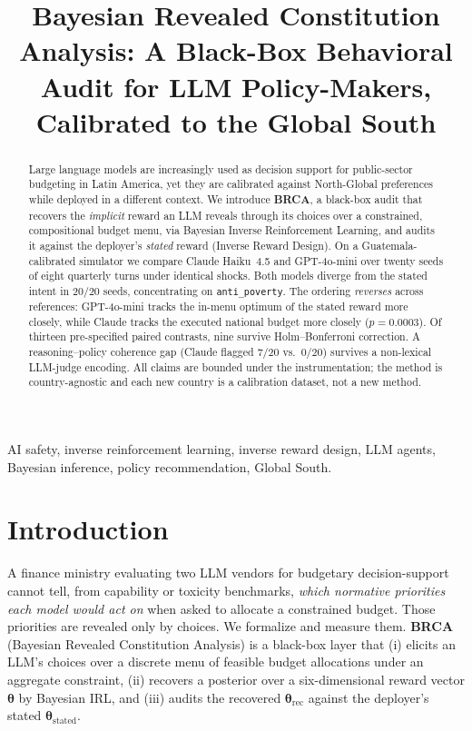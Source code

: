 \documentclass[conference]{IEEEtran}
\begin{document}
\title{Bayesian Revealed Constitution Analysis: A Black-Box Behavioral
Audit for LLM Policy-Makers, Calibrated to the Global South}

\author{
}

\maketitle

\begin{abstract}
Large language models are increasingly used as decision support for
public-sector budgeting in Latin America, yet they are calibrated
against North-Global preferences while deployed in a different context.
We introduce \textbf{BRCA}, a black-box audit that recovers the
\emph{implicit} reward an LLM reveals through its choices over a
constrained, compositional budget menu, via Bayesian Inverse
Reinforcement Learning, and audits it against the deployer's
\emph{stated} reward (Inverse Reward Design). On a Guatemala-calibrated
simulator we compare Claude Haiku~4.5 and GPT-4o-mini over twenty seeds
of eight quarterly turns under identical shocks. Both models diverge
from the stated intent in $20/20$ seeds, concentrating on
\texttt{anti\_poverty}. The ordering \emph{reverses} across references:
GPT-4o-mini tracks the in-menu optimum of the stated reward more
closely, while Claude tracks the executed national budget more closely
($p{=}0.0003$). Of thirteen pre-specified paired contrasts, nine survive
Holm--Bonferroni correction. A reasoning--policy coherence gap (Claude
flagged $7/20$ vs.\ $0/20$) survives a non-lexical LLM-judge encoding.
All claims are bounded under the instrumentation; the method is
country-agnostic and each new country is a calibration dataset, not a
new method.
\end{abstract}

\begin{IEEEkeywords}
AI safety, inverse reinforcement learning, inverse reward design, LLM
agents, Bayesian inference, policy recommendation, Global South.
\end{IEEEkeywords}

\section{Introduction}
A finance ministry evaluating two LLM vendors for budgetary
decision-support cannot tell, from capability or toxicity benchmarks,
\emph{which normative priorities each model would act on} when asked to
allocate a constrained budget. Those priorities are revealed only by
choices. We formalize and measure them. \textbf{BRCA} (Bayesian Revealed
Constitution Analysis) is a black-box layer that (i) elicits an LLM's
choices over a discrete menu of feasible budget allocations under an
aggregate constraint, (ii) recovers a posterior over a six-dimensional
reward vector $\boldsymbol{\theta}$ by Bayesian IRL, and (iii) audits the
recovered $\boldsymbol{\theta}_{\text{rec}}$ against the deployer's
stated $\boldsymbol{\theta}_{\text{stated}}$.
\end{document}
